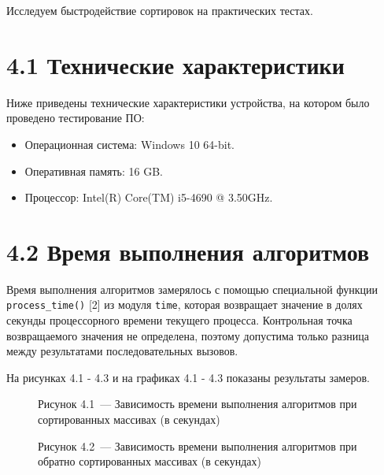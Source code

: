 \documentclass[12pt, a4paper]{report}
\begin{document}
Исследуем быстродействие сортировок на практических тестах.

\section*{4.1 Технические характеристики}

Ниже приведены технические характеристики устройства, на котором было проведено тестирование ПО:

\begin{itemize}
	\item Операционная система: Windows 10 64-bit.
	\item Оперативная память: 16 GB.
	\item Процессор: Intel(R) Core(TM) i5-4690 @ 3.50GHz.
\end{itemize}

\section*{4.2 Время выполнения алгоритмов}

Время выполнения алгоритмов замерялось с помощью специальной функции \verb|process_time()| [2] из модуля \verb|time|, которая возвращает значение в долях секунды процессорного времени текущего процесса. Контрольная точка возвращаемого значения не определена, поэтому допустима только разница между результатами последовательных вызовов.

На рисунках 4.1 - 4.3 и на графиках 4.1 - 4.3 показаны результаты замеров.

\begin{figure}[H]
\caption*{Рисунок 4.1~--- Зависимость времени выполнения алгоритмов при сортированных массивах (в секундах)}
\end{figure}

\begin{figure}[H]
\caption*{Рисунок 4.2~--- Зависимость времени выполнения алгоритмов при обратно сортированных массивах (в секундах)}
\end{figure}
\end{document}
